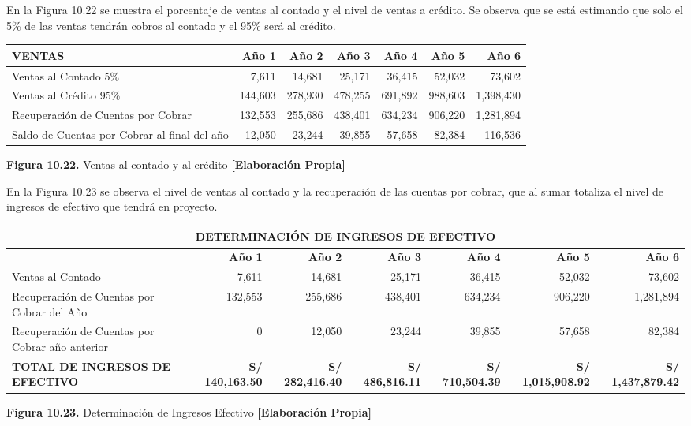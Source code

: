 En la Figura 10.22 se muestra el porcentaje de ventas al contado y el nivel de ventas a crédito. Se observa que se está estimando que solo el 5\% de las ventas tendrán cobros al contado y el 95\% será al crédito.

\begin{table}[H]
\centering
\scriptsize
\renewcommand{\arraystretch}{1.15}
\setlength{\tabcolsep}{5pt}
\begin{tabular}{|l|r|r|r|r|r|r|}
\hline
\textbf{VENTAS} & \textbf{Año 1} & \textbf{Año 2} & \textbf{Año 3} & \textbf{Año 4} & \textbf{Año 5} & \textbf{Año 6} \\ \hline
Ventas al Contado 5\% & 7,611 & 14,681 & 25,171 & 36,415 & 52,032 & 73,602 \\ \hline
Ventas al Crédito 95\% & 144,603 & 278,930 & 478,255 & 691,892 & 988,603 & 1,398,430 \\ \hline
Recuperación de Cuentas por Cobrar & 132,553 & 255,686 & 438,401 & 634,234 & 906,220 & 1,281,894 \\ \hline
Saldo de Cuentas por Cobrar al final del año & 12,050 & 23,244 & 39,855 & 57,658 & 82,384 & 116,536 \\ \hline
\end{tabular}

\vspace{0.2cm}
\textbf{Figura 10.22.} Ventas al contado y al crédito \textbf{[Elaboración Propia]}
\end{table}

En la Figura 10.23 se observa el nivel de ventas al contado y la recuperación de las cuentas por cobrar, que al sumar totaliza el nivel de ingresos de efectivo que tendrá en proyecto.

\begin{table}[H]
\centering
\scriptsize
\renewcommand{\arraystretch}{1.15}
\setlength{\tabcolsep}{4pt}
\begin{tabular}{|l|r|r|r|r|r|r|}
\hline
\multicolumn{7}{|c|}{\textbf{DETERMINACIÓN DE INGRESOS DE EFECTIVO}} \\ \hline
\textbf{} & \textbf{Año 1} & \textbf{Año 2} & \textbf{Año 3} & \textbf{Año 4} & \textbf{Año 5} & \textbf{Año 6} \\ \hline
Ventas al Contado & 7,611 & 14,681 & 25,171 & 36,415 & 52,032 & 73,602 \\ \hline
Recuperación de Cuentas por Cobrar del Año & 132,553 & 255,686 & 438,401 & 634,234 & 906,220 & 1,281,894 \\ \hline
Recuperación de Cuentas por Cobrar año anterior & 0 & 12,050 & 23,244 & 39,855 & 57,658 & 82,384 \\ \hline
\textbf{TOTAL DE INGRESOS DE EFECTIVO} & \textbf{S/ 140,163.50} & \textbf{S/ 282,416.40} & \textbf{S/ 486,816.11} & \textbf{S/ 710,504.39} & \textbf{S/ 1,015,908.92} & \textbf{S/ 1,437,879.42} \\ \hline
\end{tabular}

\vspace{0.2cm}
\textbf{Figura 10.23.} Determinación de Ingresos Efectivo \textbf{[Elaboración Propia]}
\end{table}

